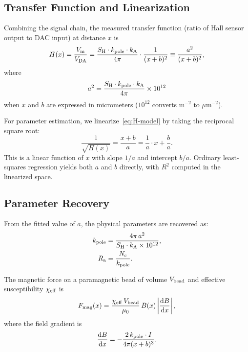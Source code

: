 \subsection{Transfer Function and Linearization}
\label{sec:linearization}

Combining the signal chain, the measured transfer function (ratio of Hall
sensor output to DAC input) at distance $x$ is
\begin{equation}
H(x) = \frac{V_\mathrm{m}}{V_\mathrm{DA}}
     = \frac{S_\mathrm{H} \cdot k_\mathrm{pole} \cdot k_\mathrm{A}}{4\pi} \cdot \frac{1}{(x+b)^2}
     \equiv \frac{a^2}{(x+b)^2},
\label{eq:H-model}
\end{equation}
where
\begin{equation}
a^2 = \frac{S_\mathrm{H} \cdot k_\mathrm{pole} \cdot k_\mathrm{A}}{4\pi} \times 10^{12}
\label{eq:a-squared}
\end{equation}
when $x$ and $b$ are expressed in micrometers ($10^{12}$ converts
$\text{m}^{-2}$ to $\mu\text{m}^{-2}$).

For parameter estimation, we linearize~\eqref{eq:H-model} by taking the
reciprocal square root:
\begin{equation}
\frac{1}{\sqrt{H(x)}} = \frac{x + b}{a} = \frac{1}{a} \cdot x + \frac{b}{a}.
\label{eq:linearized}
\end{equation}
This is a linear function of $x$ with slope $1/a$ and intercept $b/a$.
Ordinary least-squares regression yields both $a$ and $b$ directly, with
$R^2$ computed in the linearized space.

\subsection{Parameter Recovery}
\label{sec:parameter-recovery}

From the fitted value of $a$, the physical parameters are recovered as:
\begin{align}
k_\mathrm{pole} &= \frac{4\pi \, a^2}{S_\mathrm{H} \cdot k_\mathrm{A} \times 10^{12}},
\label{eq:kpole} \\
R_\mathrm{a} &= \frac{N_\mathrm{c}}{k_\mathrm{pole}}.
\label{eq:Ra}
\end{align}

The magnetic force on a paramagnetic bead of volume $V_\mathrm{bead}$ and effective
susceptibility $\chi_\mathrm{eff}$ is
\begin{equation}
F_\mathrm{mag}(x) = \frac{\chi_\mathrm{eff} \, V_\mathrm{bead}}{\mu_0} \, B(x) \left|\frac{\mathrm{d}B}{\mathrm{d}x}\right|,
\label{eq:force}
\end{equation}
where the field gradient is
\begin{equation}
\frac{\mathrm{d}B}{\mathrm{d}x} = -\frac{2 \, k_\mathrm{pole} \cdot I}{4\pi (x+b)^3}.
\label{eq:gradient}
\end{equation}
